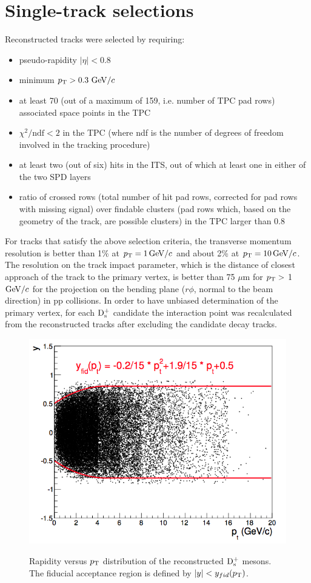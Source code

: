\section{Single-track selections}
Reconstructed tracks were selected by requiring:
\begin{itemize}
\item pseudo-rapidity $|\eta| < 0.8$
\item minimum $p_{\rm T} > 0.3~\mathrm{GeV}/c$
\item at least 70 (out of a maximum of 159, i.e. number of TPC pad rows) 
associated space points in the TPC
\item $\chi^2/\mathrm{ndf} < 2$ in the TPC (where ndf is the number of degrees of 
freedom involved in the tracking procedure)
\item at least two (out of six) hits in the ITS, out of which at least one 
in either of the two SPD layers
\item ratio of crossed rows (total number of hit pad rows, corrected 
for pad rows with missing signal) over findable clusters (pad rows which, 
based on the geometry of the track, are possible clusters) in the TPC larger than 0.8
\end{itemize}
For tracks that satisfy the above selection criteria, the transverse momentum 
resolution is better than 1$\%$ at $p_{\rm T} = 1\, \mathrm{GeV}/c$ and about 2\% at $p_{\rm T} = 10 \, \mathrm{GeV}/c$. 
The resolution on the track impact parameter, which is the distance of closest 
approach of the track to the primary vertex, is better than 75 $\mu$m for 
$p_{\rm T} >$ 1 $\mathrm{GeV}/c$ for the projection on the bending plane ($r\phi$, normal to 
the beam direction) in pp collisions.
In order to have unbiased determination of the primary vertex, for each 
${\rm D_s^+}$ candidate the interaction point was recalculated from the reconstructed 
tracks after excluding the candidate decay tracks.
\begin{figure}[!htbp]
\begin{center}
\includegraphics[width=.5\textwidth]{FigCap4/YvsPt.png}
\label{fig:singtrafter}
\caption{Rapidity versus $p_{\rm T}$ distribution of the reconstructed ${\rm D_s^+}$ mesons. The fiducial acceptance region is defined by $|y| < y_{fid}(p_{\rm T})$.}
\end{center}
\end{figure}

